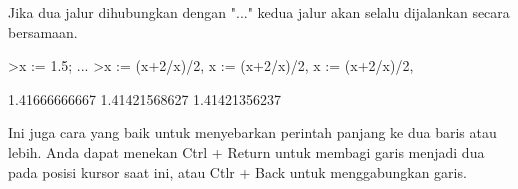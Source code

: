 \documentclass[12pt,arial,letterpaper]{book}
\begin{document}
\begin{eulernootebook}
\begin{eulercomment}
\begin{eulercomment}
\begin{eulernootebook}
\begin{eulercomment}
Jika dua jalur dihubungkan dengan "..." kedua jalur akan selalu
dijalankan secara bersamaan.
\end{eulercomment}
\begin{eulerprompt}
>x := 1.5; ...
>x := (x+2/x)/2, x := (x+2/x)/2, x := (x+2/x)/2, 
\end{eulerprompt}
\begin{euleroutput}
  1.41666666667
  1.41421568627
  1.41421356237
\end{euleroutput}
\begin{eulercomment}
Ini juga cara yang baik untuk menyebarkan perintah panjang ke dua
baris atau lebih. Anda dapat menekan Ctrl + Return untuk membagi garis
menjadi dua pada posisi kursor saat ini, atau Ctlr + Back untuk
menggabungkan garis.


\end{eulercomment}
\end{eulernootebook}
\end{eulercomment}
\end{eulercomment}
\end{eulernootebook}
\end{document}
